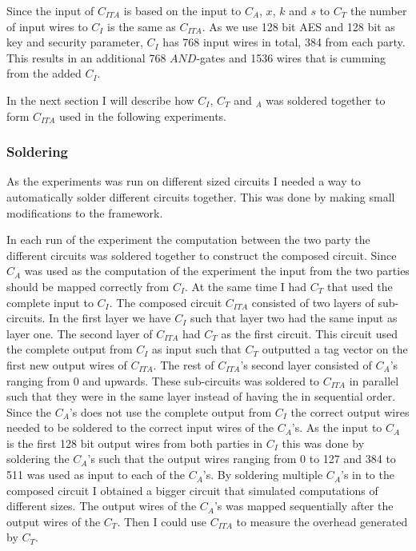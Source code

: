 \documentclass[10pt,a4paper]{article}
\newcommand{\todo}[1]{}
\renewcommand{\todo}[1]{{\color{red} TODO: {#1}} \\}
\begin{document}
Since the input of $C_{ITA}$ is based on the input to $C_A$, $x$, $k$ and $s$ to $C_T$ the number of input wires to $C_I$ is the same as $C_{ITA}$. As we use 128 bit AES and 128 bit as key and security parameter, $C_I$ has 768 input wires in total, 384 from each party. This results in an additional 768 $AND$-gates and 1536 wires that is cumming from the added $C_I$. 

In the next section I will describe how $C_I$, $C_T$ and $_A$ was soldered together to form $C_{ITA}$ used in the following experiments.

\subsubsection{Soldering}
As the experiments was run on different sized circuits I needed a way to automatically solder different circuits together. This was done by making small modifications to the framework.

In each run of the experiment the computation between the two party the different circuits was soldered together to construct the composed circuit. Since $C_A$ was used as the computation of the experiment the input from the two parties should be mapped correctly from $C_I$. At the same time I had $C_T$ that used the complete input to $C_I$. The composed circuit $C_{ITA}$ consisted of two layers of sub-circuits. In the first layer we have $C_I$ such that layer two had the same input as layer one. The second layer of $C_{ITA}$ had $C_T$ as the first circuit. This circuit used the complete output from $C_I$ as input such that $C_T$ outputted a tag vector on the first new output wires of $C_{ITA}$. The rest of $C_{ITA}$'s second layer consisted of $C_A$'s ranging from 0 and upwards. These sub-circuits was soldered to $C_{ITA}$ in parallel such that they were in the same layer instead of having the in sequential order. Since the $C_A$'s does not use the complete output from $C_I$ the correct output wires needed to be soldered to the correct input wires of the $C_A$'s. As the input to $C_A$ is the first 128 bit output wires from both parties in $C_I$ this was done by soldering the $C_A$'s such that the output wires ranging from 0 to 127 and 384 to 511 was used as input to each of the $C_A$'s. By soldering multiple $C_A$'s in to the composed circuit I obtained a bigger circuit that simulated computations of different sizes. The output wires of the $C_A$'s was mapped sequentially after the output wires of the $C_T$. Then I could use $C_{ITA}$ to measure the overhead generated by $C_T$.
\end{document}
